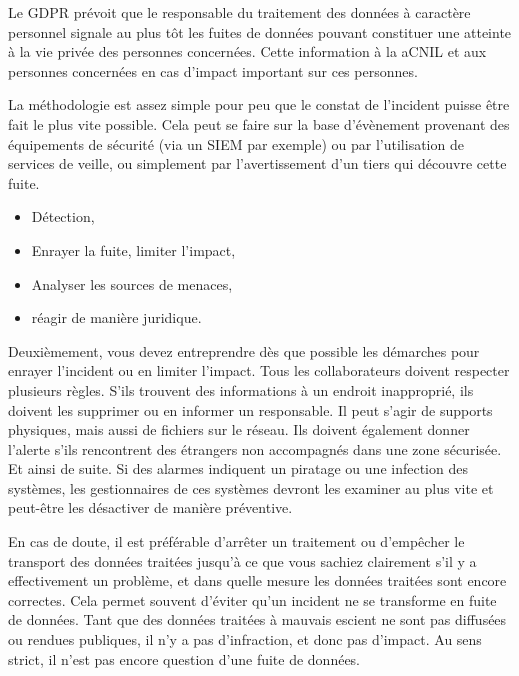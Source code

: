 
Le GDPR prévoit que le responsable du traitement des données à caractère personnel signale au plus tôt les fuites de données  pouvant constituer une atteinte à la vie privée des personnes concernées. Cette information à la \gls{aCNIL} et aux personnes concernées en cas d'impact important sur ces personnes.

La méthodologie est assez simple pour peu que le constat de l'incident puisse être fait le plus vite possible. Cela peut se faire sur la base d'évènement provenant des équipements de sécurité (via un SIEM par exemple) ou par l'utilisation de services de veille, ou simplement par l'avertissement d'un tiers qui découvre cette fuite. 

\begin{itemize}
  \item Détection,
  \item Enrayer la fuite, limiter l'impact,
  \item Analyser les sources de menaces,
  \item réagir de manière juridique.
\end{itemize}


Deuxièmement, vous devez entreprendre dès que possible les démarches pour enrayer l’incident ou en limiter l’impact. Tous les collaborateurs doivent respecter plusieurs règles. S’ils trouvent des informations à un endroit inapproprié, ils doivent les supprimer ou en informer un responsable. Il peut s’agir de supports physiques, mais aussi de fichiers sur le réseau. Ils doivent également donner l’alerte s’ils rencontrent des étrangers non accompagnés dans une zone sécurisée. Et ainsi de suite. Si des alarmes indiquent un piratage ou une infection des systèmes, les gestionnaires de ces systèmes devront les examiner au plus vite et peut-être les désactiver de manière préventive.

En cas de doute, il est préférable d’arrêter un traitement ou d’empêcher le transport des données traitées jusqu’à ce que vous sachiez clairement s’il y a effectivement un problème, et dans quelle mesure les données traitées sont encore correctes. Cela permet souvent d’éviter qu’un incident ne se transforme en fuite de données. Tant que des données traitées à mauvais escient ne sont pas diffusées ou rendues publiques, il n’y a pas d’infraction, et donc pas d’impact. Au sens strict, il n’est pas encore question d’une fuite de données.

